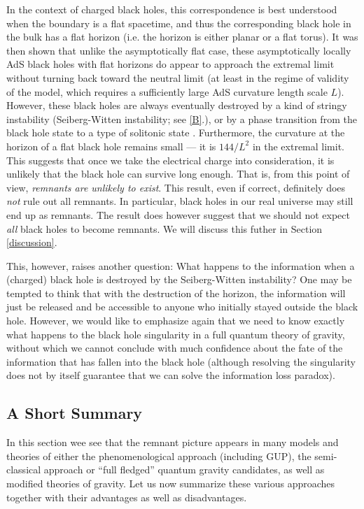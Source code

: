 \documentclass[12pt]{article}
\newcommand{\2}{$^2$}
\newcommand{\3}{$^3$}
\newcommand{\4}{$_4$}
\newcommand{\5}{$_5$}
\begin{document}
In the context of charged black holes, this correspondence is best understood when the boundary is a flat spacetime, and thus the corresponding black hole in the bulk has a flat horizon (i.e. the horizon is either planar or a flat torus). It was then shown that unlike the asymptotically flat case, these asymptotically locally AdS black holes with flat horizons do appear to approach the extremal limit without turning back toward the neutral limit (at least in the regime of validity of the model, which requires a sufficiently large AdS curvature length scale $L$). However, these black holes are always eventually destroyed by a kind of stringy instability (Seiberg-Witten instability; see \ref{B}.), or by a phase transition from the black hole state to a type of solitonic state \cite{kn:surya, kn:hormy}. Furthermore, the curvature at the horizon of a flat black hole remains small --- it is $144/L^2$ in the extremal limit. 
This suggests that once we take the electrical charge into consideration, it is unlikely that the black hole can survive long enough. That is, from this point of view, \emph{remnants are unlikely to exist}. This result, even if correct, definitely does \emph{not} rule out all remnants. In particular, black holes in our real universe may still end up as remnants. The result does however suggest that we should not expect \emph{all} black holes to become remnants. We will discuss this futher in Section \ref{discussion}. 

This, however, raises another question: What happens to the information when a (charged) black hole is destroyed by the Seiberg-Witten instability? One may be tempted to think that with the destruction of the horizon, the information will just be released and be accessible to anyone who initially stayed outside the black hole. However, we would like to emphasize again that we need to know exactly what happens to the black hole singularity in a full quantum theory of gravity, without which we cannot conclude with much confidence about the fate of the information that has fallen into the black hole (although resolving the singularity does not by itself guarantee that we can solve the information loss paradox). 



\subsection{A Short Summary}

In this section wee see that the remnant picture appears in many models and theories of either the phenomenological approach (including GUP), the semi-classical approach or ``full fledged'' quantum gravity candidates, as well as modified theories of gravity.  Let us now summarize these various approaches together with their advantages as well as disadvantages. 
\end{document}
